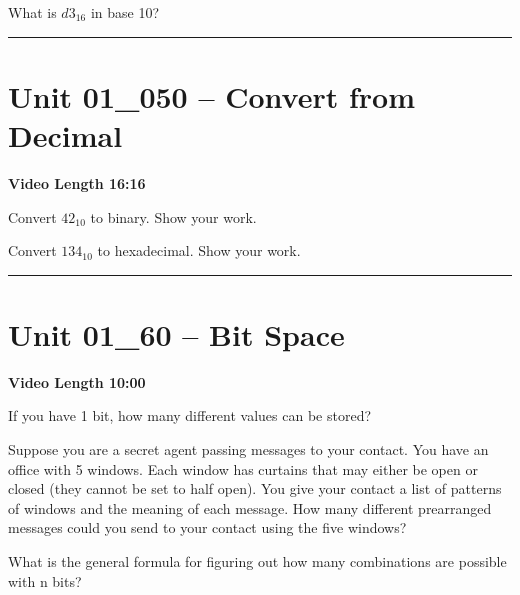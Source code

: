 \documentclass[letterpaper,12pt]{exam}
\newcommand{\unit}{Unit 01}
\begin{document}
\begin{questions}
\begin{samepage}
    \question What is $d3_{16}$ in base 10?
    \vspace{5mm}
\end{samepage}


\rule{0.5\textwidth}{.4pt} %
\section*{\unit\_050 -- Convert from Decimal}
\par{\selectfont\textbf{Video Length 16:16}}
\begin{samepage}
    \question  Convert $42_{10}$ to binary.  Show your work.
    \vspace{25mm}
\end{samepage}
\begin{samepage}
    \question Convert $134_{10}$ to hexadecimal.  Show your work.
    \vspace{25mm}
\end{samepage}
\par
 
\rule{0.5\textwidth}{.4pt} %
\section*{\unit\_60 -- Bit Space}
\par{\selectfont\textbf{Video Length 10:00}}
\begin{samepage}
    \question If you have 1 bit, how many different values can be stored?
    \vspace{5mm}
\end{samepage}
\begin{samepage}
    \question Suppose you are a secret agent passing messages to your contact.  You have an office with 5 windows.  Each window has curtains that may either be open or closed (they cannot be set to half open).  You give your contact a list of patterns of windows and the meaning of each message.  How many different prearranged messages could you send to your contact using the five windows?
    \vspace{5mm}
\end{samepage}
\par
 \begin{samepage}
     \question What is the general formula for figuring out how many combinations are possible with n bits?
     \vspace{5mm}
 \end{samepage}
 \par
  

\end{questions}
\end{document}
